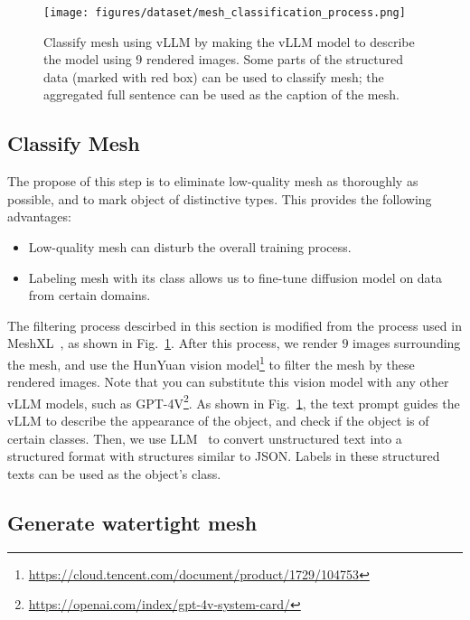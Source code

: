 \begin{figure}
    \centering 

    \texttt{[image: figures/dataset/mesh\_classification\_process.png]}
    \caption[Mesh classification.]
    {Classify mesh using vLLM by making the vLLM model to describe the model using $9$ rendered images. Some parts of the structured data (marked with red box) can be used to classify mesh; the aggregated full sentence can be used as the caption of the mesh.}
    \label{fig:dataset:3}
\end{figure}


\subsection{Classify Mesh}
\label{sec:datasets:preprocess:classify}

The propose of this step is to eliminate low-quality mesh as thoroughly as possible, and to mark object of distinctive types. 
This provides the following advantages:
\begin{itemize}
    \item Low-quality mesh can disturb the overall training process. 
    \item Labeling mesh with its class allows us to fine-tune diffusion model on data from certain domains.
\end{itemize}
The filtering process descirbed in this section is modified from the process used in MeshXL~\cite{chen2024meshxl}, as shown in Fig.~\ref{fig:dataset:3}. 
After this process, we render $9$ images surrounding the mesh, 
and use the HunYuan vision model\footnote{\url{https://cloud.tencent.com/document/product/1729/104753}} to filter the mesh by these rendered images. 
Note that you can substitute this vision model with any other vLLM models, such as GPT-4V\footnote{\url{https://openai.com/index/gpt-4v-system-card/}}.
As shown in Fig.~\ref{fig:dataset:3}, the text prompt guides the vLLM to describe the appearance of the object, and check if the object is of certain classes. 
Then, we use LLM~\cite{sun2024hunyuan} to convert unstructured text into a structured format with structures similar to JSON.
Labels in these structured texts can be used as the object's class.


\subsection{Generate watertight mesh}
\label{sec:datasets:preprocess:filter}

